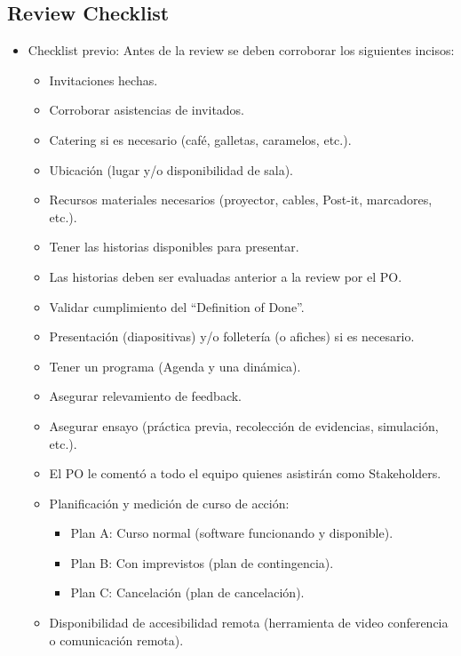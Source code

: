 \subsection{Review Checklist}

\begin{itemize}
  
  \item {Checklist previo: Antes de la review se deben corroborar los siguientes incisos:
  
  \begin{itemize}
    \item Invitaciones hechas.
    \item Corroborar asistencias de invitados.
    \item Catering si es necesario (café, galletas, caramelos, etc.).
    \item Ubicación (lugar y/o disponibilidad de sala).
    \item Recursos materiales necesarios (proyector, cables, Post-it, marcadores, etc.).
    \item Tener las historias disponibles para presentar.
    \item Las historias deben ser evaluadas anterior a la review por el PO.
    \item Validar cumplimiento del “Definition of Done”.
    \item Presentación (diapositivas) y/o folletería (o afiches) si es necesario.
    \item Tener un programa (Agenda y una dinámica).
    \item Asegurar relevamiento de feedback.
    \item Asegurar ensayo (práctica previa, recolección de evidencias, simulación, etc.).
    \item El PO le comentó a todo el equipo quienes asistirán como Stakeholders.
    \item {Planificación y medición de curso de acción:
      \begin{itemize}
        \item Plan A: Curso normal (software funcionando y disponible).
        \item Plan B: Con imprevistos (plan de contingencia).
        \item Plan C: Cancelación (plan de cancelación).
      \end{itemize}
      }
    \item Disponibilidad de accesibilidad remota (herramienta de video conferencia o comunicación remota).    
      

\end{itemize}}
\end{itemize}
